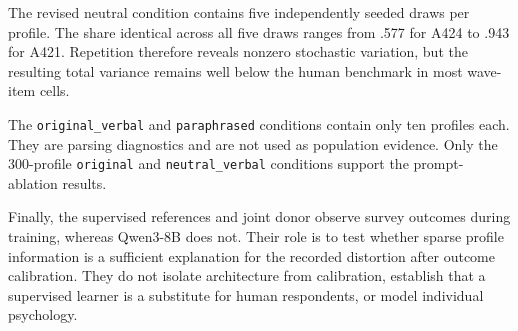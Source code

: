 \documentclass[11pt]{article}
\begin{document}
The revised neutral condition contains five independently seeded draws per profile. The share
identical across all five draws ranges from .577 for A424 to .943 for A421. Repetition therefore
reveals nonzero stochastic variation, but the resulting total variance remains well below the human
benchmark in most wave-item cells.

The \texttt{original\_verbal} and \texttt{paraphrased} conditions contain only ten profiles each.
They are parsing diagnostics and are not used as population evidence. Only the 300-profile
\texttt{original} and \texttt{neutral\_verbal} conditions support the prompt-ablation results.

Finally, the supervised references and joint donor observe survey outcomes during training, whereas
Qwen3-8B does not. Their role is to test whether sparse profile information is a sufficient
explanation for the recorded distortion after outcome calibration. They do not isolate architecture
from calibration, establish that a supervised learner is a substitute for human respondents, or
model individual psychology.
\end{document}
